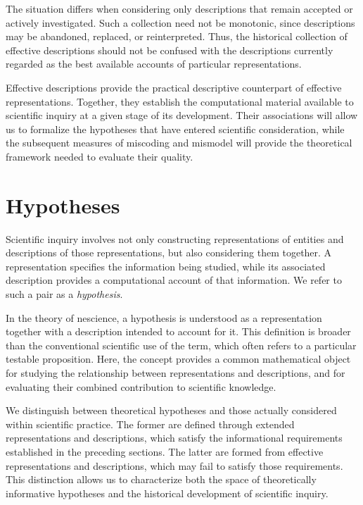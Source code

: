 The situation differs when considering only descriptions that remain accepted or actively investigated. Such a collection need not be monotonic, since descriptions may be abandoned, replaced, or reinterpreted. Thus, the historical collection of effective descriptions should not be confused with the descriptions currently regarded as the best available accounts of particular representations.

Effective descriptions provide the practical descriptive counterpart of effective representations. Together, they establish the computational material available to scientific inquiry at a given stage of its development. Their associations will allow us to formalize the hypotheses that have entered scientific consideration, while the subsequent measures of miscoding and mismodel will provide the theoretical framework needed to evaluate their quality.

%
%

\section{Hypotheses}
\label{sec:hypotheses}

Scientific inquiry involves not only constructing representations of entities and descriptions of those representations, but also considering them together. A representation specifies the information being studied, while its associated description provides a computational account of that information. We refer to such a pair as a \emph{hypothesis}.

In the theory of nescience, a hypothesis is understood as a representation together with a description intended to account for it. This definition is broader than the conventional scientific use of the term, which often refers to a particular testable proposition. Here, the concept provides a common mathematical object for studying the relationship between representations and descriptions, and for evaluating their combined contribution to scientific knowledge.

We distinguish between theoretical hypotheses and those actually considered within scientific practice. The former are defined through extended representations and descriptions, which satisfy the informational requirements established in the preceding sections. The latter are formed from effective representations and descriptions, which may fail to satisfy those requirements. This distinction allows us to characterize both the space of theoretically informative hypotheses and the historical development of scientific inquiry.

